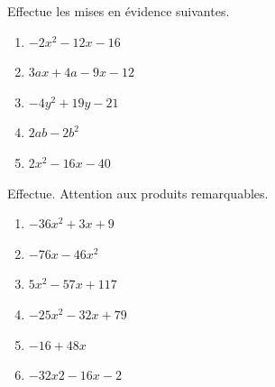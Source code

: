 \documentclass[12pt,parskip=half-, twoside=semi]{scrartcl}
\begin{document}
\begin{exercise}Effectue les mises en évidence suivantes.
  \begin{enumerate}[cols=2]
      \item $-2x^2-12x-16$
      \item $3ax+4a-9x-12$
      \item $-4y^2+19y-21$
      \item $2ab-2b^2$
      \item $2x^2-16x-40$
  \end{enumerate}
\end{exercise}

\begin{exercise}Effectue. Attention aux produits remarquables.
  \begin{enumerate}
      \item $-36x^2+3x+9$
      \item $-76x-46x^2$
      \item $5x^2-57x+117$
      \item $-25x^2-32x+79$
      \item $-16+48x$
      \item $-32x2-16x-2$
  \end{enumerate}
\end{exercise}
\end{document}
